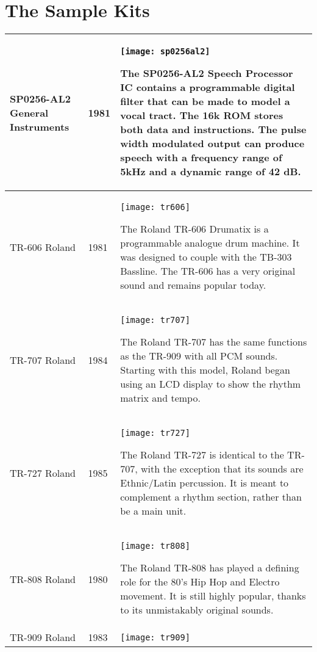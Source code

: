 \chapter{The Sample Kits}


\tablelasttail{ \hline }
\begin{xtabular}{p{2.4cm}|l|p{9.1cm}}

\hline
SP0256-AL2 \linebreak
General Instruments 
& 1981 & 
\texttt{[image: sp0256al2]}

The SP0256-AL2 Speech Processor IC contains a programmable digital filter that can be made to model a vocal tract. The 16k ROM stores both data and instructions. The pulse width modulated output can produce speech with a frequency range of 5kHz and a dynamic range of 42 dB. \\
\hline
TR-606 \linebreak Roland & 1981 & 
\texttt{[image: tr606]}

The Roland TR-606 Drumatix is a programmable analogue drum machine. It was designed to couple with the TB-303 Bassline. The TR-606 has a very original sound and remains popular today. \\
\hline
TR-707 \linebreak Roland & 1984 & 
\texttt{[image: tr707]}

The Roland TR-707 has the same functions as the TR-909 with all PCM sounds. Starting with this model, Roland began using an LCD display to show the rhythm matrix and tempo. \\
\hline
TR-727 \linebreak Roland & 1985 & 
\texttt{[image: tr727]}

The Roland TR-727 is identical to the TR-707, with the exception that its sounds are Ethnic/Latin percussion. It is meant to complement a rhythm section, rather than be a main unit. \\
\hline
TR-808 \linebreak Roland & 1980 & 
\texttt{[image: tr808]}

The Roland TR-808 has played a defining role for the 80's Hip Hop and Electro movement. It is still highly popular, thanks to its unmistakably original sounds. \\
\hline
TR-909 \linebreak Roland & 1983 & 
\texttt{[image: tr909]}


\end{xtabular}
